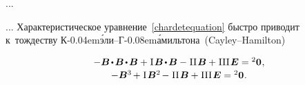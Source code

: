 \begin{otherlanguage}{russian}
...



... Характеристическое уравнение~\eqref{chardetequation} быстро приводит к~тождеству К\kern-0.04em\'{э}ли\hbox{--}Г\kern-0.08em\'{а}мильтона~(Cayley\hbox{--}Hamilton)

\nopagebreak\vspace{-0.2em}\begin{equation}\label{cayley-hamilton equation}
\begin{array}{c}
-\bm{B} \hspace{-0.2ex} \dotp \hspace{-0.2ex} \bm{B} \hspace{-0.2ex} \dotp \hspace{-0.2ex} \bm{B}
+ \hspace{.1ex} \mathrm{I} \hspace{.2ex} \bm{B} \hspace{-0.2ex} \dotp \hspace{-0.2ex} \bm{B}
- \hspace{.1ex} \mathrm{II} \hspace{.2ex} \bm{B}
+ \hspace{.1ex} \mathrm{III} \hspace{.2ex} \UnitDyad
= {^2\bm{0}}
\hspace{.1ex} ,
\\[.16em]
-\bm{B}^{3} \hspace{-0.2ex}
+ \hspace{.1ex} \mathrm{I} \hspace{.2ex} \bm{B}^{2} \hspace{-0.2ex}
- \hspace{.1ex} \mathrm{II} \hspace{.2ex} \bm{B}
+ \hspace{.1ex} \mathrm{III} \hspace{.2ex} \UnitDyad
= {^2\bm{0}}
\hspace{.1ex} .
\end{array}
\end{equation}

\end{otherlanguage}


